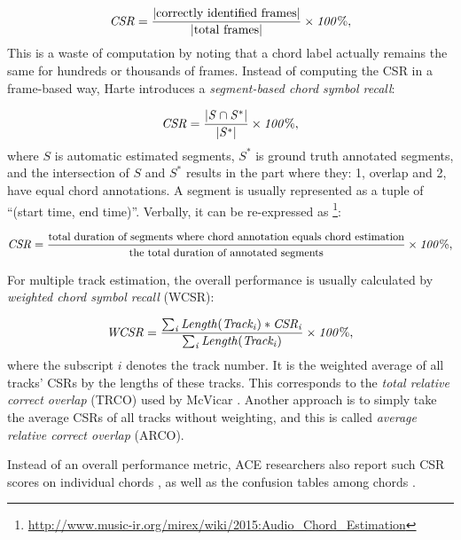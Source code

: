 \begin{equation}
\mathit{CSR={|\text{correctly identified frames}| \over |\text{total frames}|}\times 100\%,}
\end{equation}
This is a waste of computation by noting that a chord label actually remains the same for hundreds or thousands of frames. Instead of computing the CSR in a frame-based way, Harte \cite{harte2010towards} introduces a {\it segment-based chord symbol recall}:

\begin{equation}
\mathit{CSR = {|S\cap S^*|\over|S^*|} \times 100\%,}
\label{eq:2-csr}
\end{equation}
where $S$ is automatic estimated segments, $S^*$ is ground truth annotated segments, and the intersection of $S$ and $S^*$ results in the part where they: 1, overlap and 2, have equal chord annotations. A segment is usually represented as a tuple of ``(start time, end time)''. Verbally, it can be re-expressed as \footnote{\url{http://www.music-ir.org/mirex/wiki/2015:Audio\_Chord\_Estimation}}:

\begin{equation}\footnotesize
\mathit{CSR = {\text{total duration of segments where chord annotation equals chord estimation}\over\text{the total duration of annotated segments}} \times 100\%,}
\label{eq:2-csrv}
\end{equation}

For multiple track estimation, the overall performance is usually calculated by {\it weighted chord symbol recall} (WCSR):

\begin{equation}
\mathit{WCSR = {\sum_i{Length(Track_i)*CSR_i} \over \sum_i{Length(Track_i)}}\times 100\%,}
\label{eq:2-wcsr}
\end{equation}
where the subscript $i$ denotes the track number. It is the weighted average of all tracks' CSRs by the lengths of these tracks. This corresponds to the {\it total relative correct overlap} (TRCO) used by McVicar \cite{mcvicar2013machine}. Another approach is to simply take the average CSRs of all tracks without weighting, and this is called {\it average relative correct overlap} (ARCO).

Instead of an overall performance metric, ACE researchers also report such CSR scores on individual chords \cite{mauch2010automatic,deng2016chord}, as well as the confusion tables among chords \cite{mauch2010automatic,oudre2010template,papadopoulos2010joint,khadkevich2011music,deng2016hybrid}.

